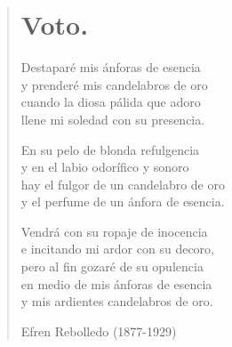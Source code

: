 \documentclass[12pt, twoside]{book}
\begin{document}
\begin{verse}
\begin{center}
\section{Voto.}
\end{center}

Destaparé mis ánforas de esencia\\
y prenderé mis candelabros de oro\\
cuando la diosa pálida que adoro\\
llene mi soledad con su presencia.\newline

En su pelo de blonda refulgencia\\
y en el labio odorífico y sonoro\\
hay el fulgor de un candelabro de oro\\
y el perfume de un ánfora de esencia.\newline

Vendrá con su ropaje de inocencia\\
e incitando mi ardor con su decoro,\\
pero al fin gozaré de su opulencia\\
en medio de mis ánforas de esencia\\
y mis ardientes candelabros de oro.\newline

Efren Rebolledo (1877-1929)

\end{verse}
\newpage
\end{document}
